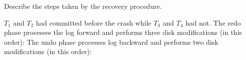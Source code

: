 \noindent Describe the steps taken by the recovery procedure.

\begin{sol}
 $T_1$ and $T_2$ had committed before the crash while $T_3$ and $T_4$ had not. The redo phase processes the log forward and performs three disk modifications (in this order):
The undo phase processes log backward and performs two disk modifications (in this order):
\end{sol}




